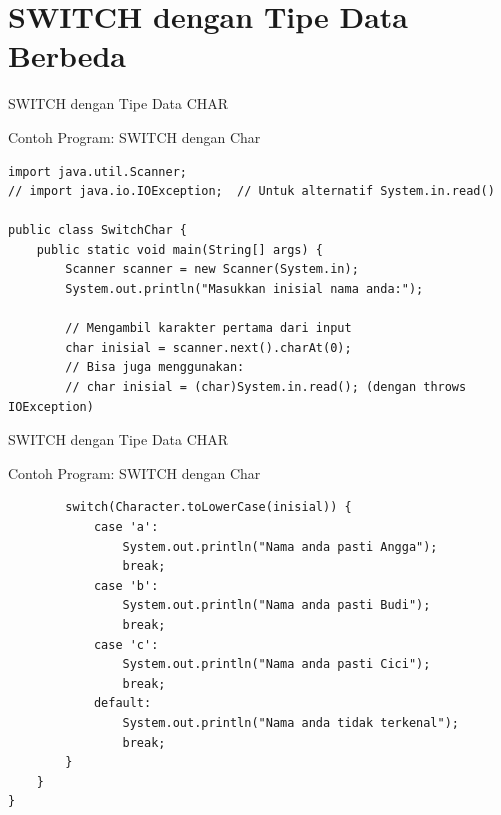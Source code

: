 \documentclass{beamer}
\begin{document}
\section{SWITCH dengan Tipe Data Berbeda}
\begin{frame}[fragile]{SWITCH dengan Tipe Data CHAR}
  \begin{exampleblock}{Contoh Program: SWITCH dengan Char}
    \begin{lstlisting}
import java.util.Scanner;
// import java.io.IOException;  // Untuk alternatif System.in.read()

public class SwitchChar {
    public static void main(String[] args) {
        Scanner scanner = new Scanner(System.in);
        System.out.println("Masukkan inisial nama anda:");
        
        // Mengambil karakter pertama dari input
        char inisial = scanner.next().charAt(0);
        // Bisa juga menggunakan: 
        // char inisial = (char)System.in.read(); (dengan throws IOException)
    \end{lstlisting}
  \end{exampleblock}
\end{frame}

\begin{frame}[fragile]{SWITCH dengan Tipe Data CHAR}
  \begin{exampleblock}{Contoh Program: SWITCH dengan Char}
    \begin{lstlisting}
        switch(Character.toLowerCase(inisial)) {
            case 'a': 
                System.out.println("Nama anda pasti Angga");
                break;
            case 'b': 
                System.out.println("Nama anda pasti Budi");
                break;
            case 'c': 
                System.out.println("Nama anda pasti Cici");
                break;
            default: 
                System.out.println("Nama anda tidak terkenal");
                break;
        }
    }
}
    \end{lstlisting}
  \end{exampleblock}
\end{frame}
\end{document}
